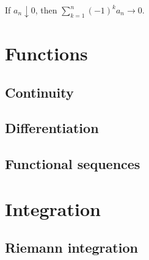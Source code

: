 \documentclass{../note}
\begin{document}
\begin{prb}
\begin{parts}
\item If $a_n\downarrow0$, then $\sum_{k=1}^n(-1)^ka_n\to0$.
\end{parts}
\end{prb}


\part{Functions}

\chapter{Continuity}

\chapter{Differentiation}

\chapter{Functional sequences}


\part{Integration}

\chapter{Riemann integration}
\end{document}
